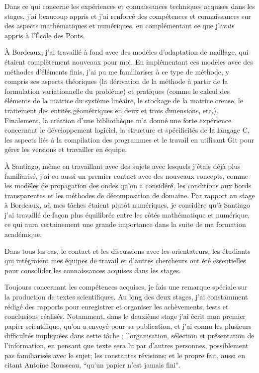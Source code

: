 \indent Dans ce qui concerne les expériences et connaissances techniques acquises dans les stages, j'ai beaucoup appris et j'ai renforcé des compétences et connaissances sur des aspects mathématiques et numériques, en complémentant ce que j'avais appris à l'École des Ponts.

\indent À Bordeaux, j'ai travaillé à fond avec des modèles d'adaptation de maillage, qui étaient complètement nouveaux pour moi. En implémentant ces modèles avec des méthodes d'éléments finis, j'ai pu me familiariser à ce type de méthode, y compris ses aspects théoriques (la dérivation de la méthode à partir de la formulation variationnelle du problème) et pratiques (comme le calcul des éléments de la matrice du système linéaire, le stockage de la matrice creuse, le traitement des entités géométriques en deux et trois dimensions, etc.). Finalement, la création d'une bibliothèque m'a donné une forte expérience concernant le développement logiciel, la structure et spécificités de la langage C, les aspects liés à la compilation des programmes et le travail en utilisant Git pour gérer les versions et travailler en équipe.

\indent À Santiago, même en travaillant avec des sujets avec lesquels j'étais déjà plus familiarisé, j'ai eu aussi un premier contact avec des nouveaux concepts, comme les modèles de propagation des ondes qu'on a considéré, les conditions aux bords transparentes et les méthodes de décomposition de domaine. Par rapport au stage à Bordeaux, où mes tâches étaient plutôt numériques, je considère qu'à Santiago j'ai travaillé de façon plus équilibrée entre les côtés mathématique et numérique, ce qui aura certainement une grande importance dans la suite de ma formation académique.

\indent Dans tous les cas, le contact et les discussions avec les orientateurs, les étudiants qui intégraient mes équipes de travail et d'autres chercheurs ont été essentielles pour consolider les connaissances acquises dans les stages.

\indent Toujours concernant les compétences acquises, je fais une remarque spéciale sur la production de textes scientifiques. Au long des deux stages, j'ai constamment rédigé des rapports pour enregistrer et organiser les achèvements, tests et conclusions réalisés. Notamment, dans le deuxième stage j'ai écrit mon premier papier scientifique, qu'on a envoyé pour sa publication, et j'ai connu les plusieurs difficultés impliquées dans cette tâche : l'organisation, sélection et présentation de l'information, en pensant que texte sera lu par d'autres personnes, possiblement pas familiarisés avec le sujet; les constantes révisions; et le propre fait, aussi en citant Antoine Rousseau, ``qu'un papier n'est jamais fini".

